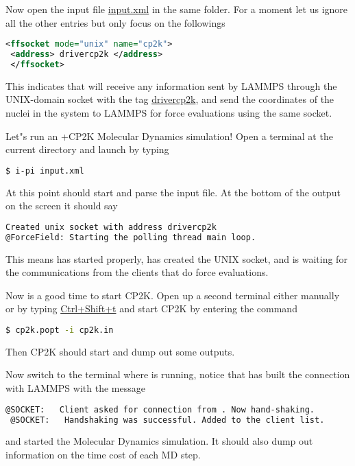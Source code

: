 \documentclass{article}
\begin{document}
\begin{Exercise}[label={i-pi},title={Molecular Dynamics: a client/server approach}]
\Question
Now open the \ipi{} input file \url{input.xml} in the same folder.
For a moment let us ignore all the other entries but only focus on the followings
\begin{lstlisting}[language=xml]
 <ffsocket mode="unix" name="cp2k">
 <address> drivercp2k </address>
 </ffsocket>
\end{lstlisting}
This indicates that \ipi{} will receive any information sent by LAMMPS through the UNIX-domain socket with the tag \url{drivercp2k},
and send the coordinates of the nuclei in the system to LAMMPS for force evaluations using the same socket.

\Question
Let"s run an \ipi{}+CP2K Molecular Dynamics simulation!
Open a terminal at the current directory and
launch \ipi{} by typing
\begin{lstlisting}[language=bash]
$ i-pi input.xml 
\end{lstlisting}
At this point \ipi{} should start 
and parse the input file. At the bottom of the output on the screen it should say
\begin{lstlisting}[language=bash]
Created unix socket with address drivercp2k
@ForceField: Starting the polling thread main loop.
\end{lstlisting}
This means \ipi{} has started properly, has created the UNIX socket, and is waiting for the communications from the clients that do force evaluations.

\Question
Now is a good time to start CP2K. Open up a second terminal either manually or by typing \url{Ctrl+Shift+t} and start CP2K by entering the command
\begin{lstlisting}[language=bash]
$ cp2k.popt -i cp2k.in
\end{lstlisting}
Then CP2K should start and dump out some outputs.

\Question
Now switch to the terminal where \ipi{} is running, notice that \ipi{} has built the connection with LAMMPS with the message
\begin{lstlisting}[language=sh]
 @SOCKET:   Client asked for connection from . Now hand-shaking.
 @SOCKET:   Handshaking was successful. Added to the client list.
\end{lstlisting}
and started the Molecular Dynamics simulation.
It should also dump out information on the time cost of each MD step.


\end{Exercise}
\end{document}
